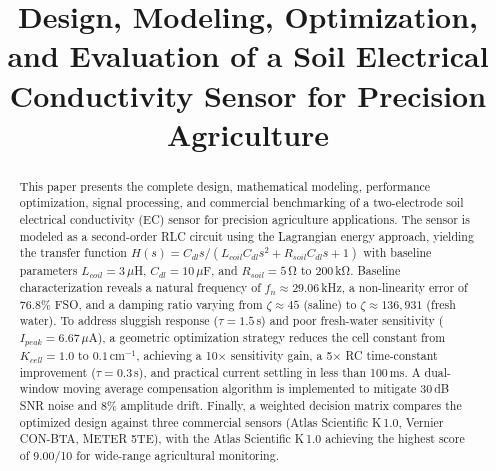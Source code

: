 \documentclass[conference]{IEEEtran}
\begin{document}
\title{Design, Modeling, Optimization, and Evaluation of a Soil Electrical Conductivity Sensor for Precision Agriculture}

\author{
\and
{}
\and
{}
\and
{}
\and
{}
}

\maketitle

\begin{abstract}
This paper presents the complete design, mathematical modeling, performance optimization, signal processing, and commercial benchmarking of a two-electrode soil electrical conductivity (EC) sensor for precision agriculture applications. The sensor is modeled as a second-order RLC circuit using the Lagrangian energy approach, yielding the transfer function $H(s) = C_{dl}s / (L_{coil}C_{dl}s^2 + R_{soil}C_{dl}s + 1)$ with baseline parameters $L_{coil}=3\,\mu$H, $C_{dl}=10\,\mu$F, and $R_{soil}=5$\,\si{\ohm} to $200$\,k\si{\ohm}. Baseline characterization reveals a natural frequency of $f_n \approx 29.06$\,kHz, a non-linearity error of 76.8\% FSO, and a damping ratio varying from $\zeta \approx 45$ (saline) to $\zeta \approx 136{,}931$ (fresh water). To address sluggish response ($\tau = 1.5$\,s) and poor fresh-water sensitivity ($I_{peak} = 6.67\,\mu$A), a geometric optimization strategy reduces the cell constant from $K_{cell} = 1.0$ to $0.1\,\text{cm}^{-1}$, achieving a 10$\times$ sensitivity gain, a 5$\times$ RC time-constant improvement ($\tau = 0.3$\,s), and practical current settling in less than 100\,ms. A dual-window moving average compensation algorithm is implemented to mitigate 30\,dB SNR noise and 8\% amplitude drift. Finally, a weighted decision matrix compares the optimized design against three commercial sensors (Atlas Scientific K\,1.0, Vernier CON-BTA, METER 5TE), with the Atlas Scientific K\,1.0 achieving the highest score of 9.00/10 for wide-range agricultural monitoring.
\end{abstract}
\end{document}
